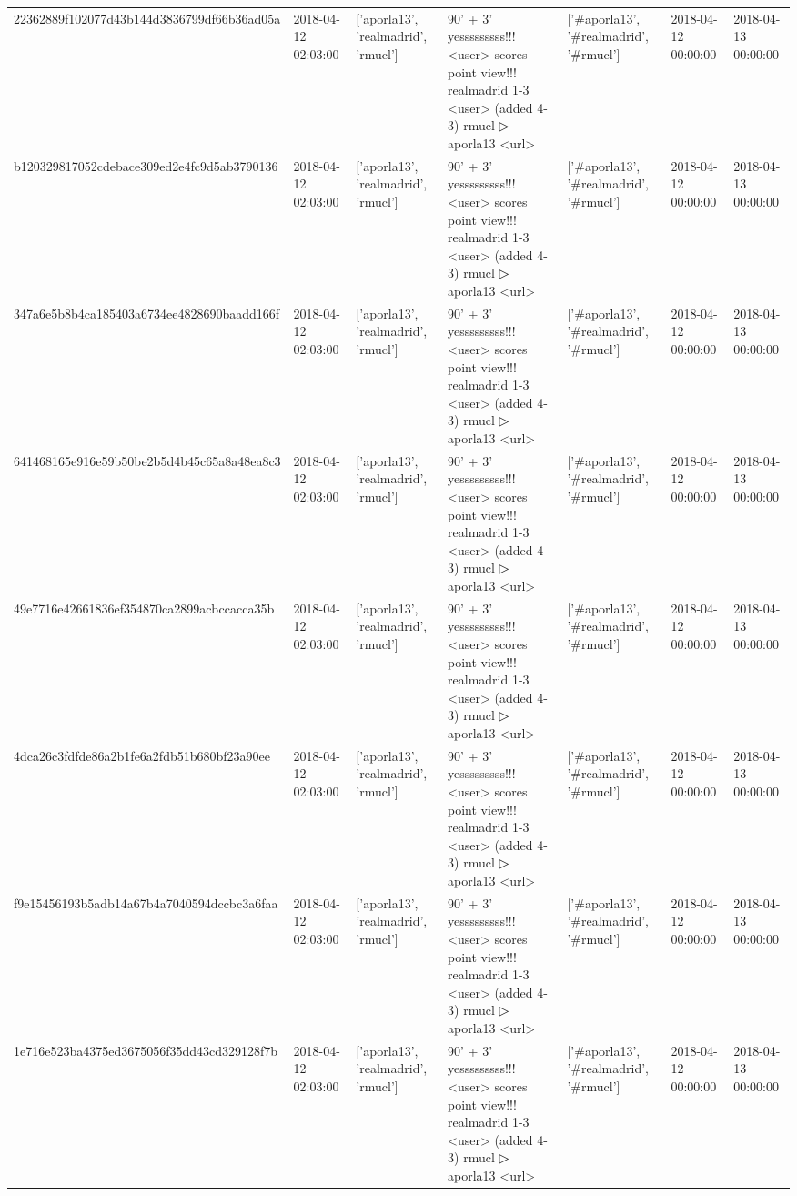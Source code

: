 \begin{tabular}{lllllll}
22362889f102077d43b144d3836799df66b36ad05a & 2018-04-12 02:03:00 & ['aporla13', 'realmadrid', 'rmucl'] & 90' + 3' yesssssssss!!! <user> scores point view!!! realmadrid 1-3 <user> (added 4-3) rmucl ▷ aporla13 <url> & ['#aporla13', '#realmadrid', '#rmucl'] & 2018-04-12 00:00:00 & 2018-04-13 00:00:00 \\
b120329817052cdebace309ed2e4fc9d5ab3790136 & 2018-04-12 02:03:00 & ['aporla13', 'realmadrid', 'rmucl'] & 90' + 3' yesssssssss!!! <user> scores point view!!! realmadrid 1-3 <user> (added 4-3) rmucl ▷ aporla13 <url> & ['#aporla13', '#realmadrid', '#rmucl'] & 2018-04-12 00:00:00 & 2018-04-13 00:00:00 \\
347a6e5b8b4ca185403a6734ee4828690baadd166f & 2018-04-12 02:03:00 & ['aporla13', 'realmadrid', 'rmucl'] & 90' + 3' yesssssssss!!! <user> scores point view!!! realmadrid 1-3 <user> (added 4-3) rmucl ▷ aporla13 <url> & ['#aporla13', '#realmadrid', '#rmucl'] & 2018-04-12 00:00:00 & 2018-04-13 00:00:00 \\
641468165e916e59b50be2b5d4b45c65a8a48ea8c3 & 2018-04-12 02:03:00 & ['aporla13', 'realmadrid', 'rmucl'] & 90' + 3' yesssssssss!!! <user> scores point view!!! realmadrid 1-3 <user> (added 4-3) rmucl ▷ aporla13 <url> & ['#aporla13', '#realmadrid', '#rmucl'] & 2018-04-12 00:00:00 & 2018-04-13 00:00:00 \\
49e7716e42661836ef354870ca2899acbccacca35b & 2018-04-12 02:03:00 & ['aporla13', 'realmadrid', 'rmucl'] & 90' + 3' yesssssssss!!! <user> scores point view!!! realmadrid 1-3 <user> (added 4-3) rmucl ▷ aporla13 <url> & ['#aporla13', '#realmadrid', '#rmucl'] & 2018-04-12 00:00:00 & 2018-04-13 00:00:00 \\
4dca26c3fdfde86a2b1fe6a2fdb51b680bf23a90ee & 2018-04-12 02:03:00 & ['aporla13', 'realmadrid', 'rmucl'] & 90' + 3' yesssssssss!!! <user> scores point view!!! realmadrid 1-3 <user> (added 4-3) rmucl ▷ aporla13 <url> & ['#aporla13', '#realmadrid', '#rmucl'] & 2018-04-12 00:00:00 & 2018-04-13 00:00:00 \\
f9e15456193b5adb14a67b4a7040594dccbc3a6faa & 2018-04-12 02:03:00 & ['aporla13', 'realmadrid', 'rmucl'] & 90' + 3' yesssssssss!!! <user> scores point view!!! realmadrid 1-3 <user> (added 4-3) rmucl ▷ aporla13 <url> & ['#aporla13', '#realmadrid', '#rmucl'] & 2018-04-12 00:00:00 & 2018-04-13 00:00:00 \\
1e716e523ba4375ed3675056f35dd43cd329128f7b & 2018-04-12 02:03:00 & ['aporla13', 'realmadrid', 'rmucl'] & 90' + 3' yesssssssss!!! <user> scores point view!!! realmadrid 1-3 <user> (added 4-3) rmucl ▷ aporla13 <url> & ['#aporla13', '#realmadrid', '#rmucl'] & 2018-04-12 00:00:00 & 2018-04-13 00:00:00 \\

\end{tabular}
